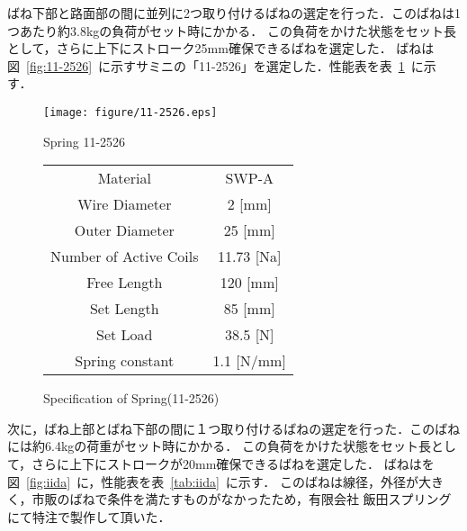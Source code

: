 \documentclass[a4paper,12pt]{article_vdlab_sotsuron}
\begin{document}
\newpage
ばね下部と路面部の間に並列に2つ取り付けるばねの選定を行った．このばねは1つあたり約3.8kgの負荷がセット時にかかる．
この負荷をかけた状態をセット長として，さらに上下にストローク25mm確保できるばねを選定した．
ばねは図~\ref{fig:11-2526}~に示すサミニの「11-2526」を選定した．性能表を表~\ref{tab:11-2526}~に示す．


\vspace*{10mm}
\begin{figure}[htp]
  \begin{minipage}{0.35\textwidth}
    \begin{center}
      \texttt{[image: figure/11-2526.eps]}
      \vspace*{3mm}
      \caption{Spring 11-2526}
      \label{fig:11-2526}
    \end{center}
  \end{minipage}
  \begin{minipage}{0.6\textwidth}
      \begin{center}
	\makeatletter
	\def\@captype{table}
	\makeatother
	\caption{Specification of Spring(11-2526)}
	\label{tab:11-2526}
	  \begin{tabular}{cc}\hline
	    Material & SWP-A \\
	    Wire Diameter & 2 [mm] \\
	    Outer Diameter & 25 [mm] \\
	    Number of Active Coils & 11.73 [Na] \\
	    Free Length & 120 [mm] \\
	    Set Length & 85 [mm] \\
	    Set Load & 38.5 [N]\\
	    Spring constant & 1.1 [N/mm] \\\hline
	  \end{tabular}
	\end{center}
  \end{minipage}
\end{figure}


\vspace*{10mm}
\par
次に，ばね上部とばね下部の間に１つ取り付けるばねの選定を行った．このばねには約6.4kgの荷重がセット時にかかる．
この負荷をかけた状態をセット長として，さらに上下にストロークが20mm確保できるばねを選定した．
ばねはを図~\ref{fig:iida}~に，性能表を表~\ref{tab:iida}~に示す．
このばねは線径，外径が大きく，市販のばねで条件を満たすものがなかったため，有限会社 飯田スプリングにて特注で製作して頂いた．
\end{document}
